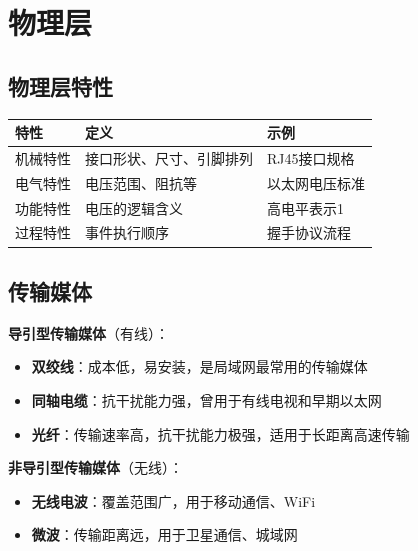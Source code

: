 \chapter{物理层}
\section{物理层特性}
\begin{table}[htbp]
\centering\small
\begin{tabular}{lll}
\toprule
\textbf{特性} & \textbf{定义} & \textbf{示例} \\
\midrule
机械特性 & 接口形状、尺寸、引脚排列 & RJ45接口规格 \\
电气特性 & 电压范围、阻抗等 & 以太网电压标准 \\
功能特性 & 电压的逻辑含义 & 高电平表示1 \\
过程特性 & 事件执行顺序 & 握手协议流程 \\
\bottomrule
\end{tabular}
\end{table}

\section{传输媒体}
\begin{center}
\end{center}

\textbf{导引型传输媒体}（有线）：
\begin{itemize}[leftmargin=2em,itemsep=0pt]
    \item \textbf{双绞线}：成本低，易安装，是局域网最常用的传输媒体
    \item \textbf{同轴电缆}：抗干扰能力强，曾用于有线电视和早期以太网
    \item \textbf{光纤}：传输速率高，抗干扰能力极强，适用于长距离高速传输
\end{itemize}

\textbf{非导引型传输媒体}（无线）：
\begin{itemize}[leftmargin=2em,itemsep=0pt]
    \item \textbf{无线电波}：覆盖范围广，用于移动通信、WiFi
    \item \textbf{微波}：传输距离远，用于卫星通信、城域网
\end{itemize}

